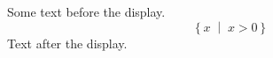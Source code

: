 \documentclass[12pt]{article}
\begin{document}
Some text before the display.
\[ \left\{ x \;\middle|\; x > 0 \right\} \]
Text after the display.
\end{document}
